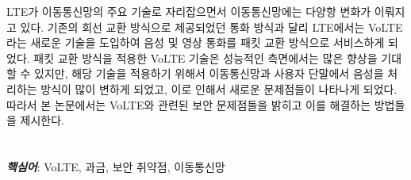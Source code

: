 \begin{summary}
LTE가 이동통신망의 주요 기술로 자리잡으면서 이동통신망에는 다양항 변화가
이뤄지고 있다. 기존의 회선 교환 방식으로 제공되었던 통화 방식과 달리 LTE에서는
VoLTE라는 새로운 기술을 도입하여 음성 및 영상 통화를 패킷 교환 방식으로
서비스하게 되었다. 패킷 교환 방식을 적용한 VoLTE 기술은 성능적인 측면에서는 많은
향상을 기대할 수 있지만, 해당 기술을 적용하기 위해서 이동통신망과 사용자
단말에서 음성을 처리하는 방식이 많이 변하게 되었고, 이로 인해서 새로운
문제점들이 나타나게 되었다. 따라서 본 논문에서는 VoLTE와 관련된 보안 문제점들을
밝히고 이를 해결하는 방법들을 제시한다.
\\
\\
\\
\textbf{\textit{핵심어}}: VoLTE, 과금, 보안 취약점, 이동통신망

\end{summary}
